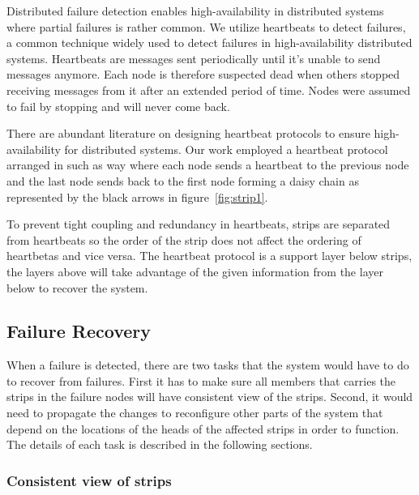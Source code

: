 Distributed failure detection enables high-availability in distributed systems
where partial failures is rather common.  We utilize heartbeats to detect
failures, a common technique widely used to detect failures in high-availability
distributed systems.  Heartbeats are messages sent periodically until it's
unable to send messages anymore. Each node is therefore suspected dead when
others stopped receiving messages from it after an extended period of time.
Nodes were assumed to fail by stopping and will never come back.

There are abundant literature on designing heartbeat protocols to ensure
high-availability for distributed systems. Our work employed a heartbeat
protocol arranged in such as way where each node sends a heartbeat to the
previous node and the last node sends back to the first node forming a daisy
chain as represented by the black arrows in figure~\ref{fig:strip1}.

To prevent tight coupling and redundancy in heartbeats, strips are separated
from heartbeats so the order of the strip does not affect the ordering of
heartbetas and vice versa. The heartbeat protocol is a support layer below
strips, the layers above will take advantage of the given information from the
layer below to recover the system.

\subsection{Failure Recovery}
\label{s:fr}

When a failure is detected, there are two tasks that the system would have to do
to recover from failures. First it has to make sure all members that carries
the strips in the failure nodes will have consistent view of the strips.
Second, it would need to propagate the changes to reconfigure other parts of
the system that depend on the locations of the heads of the affected strips in
order to function. The details of each task is described in the following
sections.

\subsubsection{Consistent view of strips}

